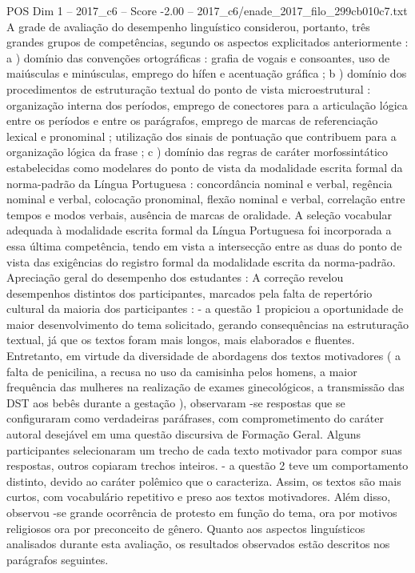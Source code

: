 \begin{textsample}{POS Dim 1 – 2017\_c6 – Score -2.00 – 2017\_c6/enade\_2017\_filo\_299cb010c7.txt}
A grade de avaliação do desempenho linguístico considerou, portanto, três grandes grupos de competências, segundo os aspectos explicitados anteriormente : a ) domínio das convenções ortográficas : grafia de vogais e consoantes, uso de maiúsculas e minúsculas, emprego do hífen e acentuação gráfica ; b ) domínio dos procedimentos de estruturação textual do ponto de vista microestrutural : organização interna dos períodos, emprego de conectores para a articulação lógica entre os períodos e entre os parágrafos, emprego de marcas de referenciação lexical e pronominal ; utilização dos sinais de pontuação que contribuem para a organização lógica da frase ; c ) domínio das regras de caráter morfossintático estabelecidas como modelares do ponto de vista da modalidade escrita formal da norma-padrão da Língua Portuguesa : concordância nominal e verbal, regência nominal e verbal, colocação pronominal, flexão nominal e verbal, correlação entre tempos e modos verbais, ausência de marcas de oralidade.
A seleção vocabular adequada à modalidade escrita formal da Língua Portuguesa foi incorporada a essa última competência, tendo em vista a intersecção entre as duas do ponto de vista das exigências do registro formal da modalidade escrita da norma-padrão.
Apreciação geral do desempenho dos estudantes : A correção revelou desempenhos distintos dos participantes, marcados pela falta de repertório cultural da maioria dos participantes : - a questão 1 propiciou a oportunidade de maior desenvolvimento do tema solicitado, gerando consequências na estruturação textual, já que os textos foram mais longos, mais elaborados e fluentes.
Entretanto, em virtude da diversidade de abordagens dos textos motivadores ( a falta de penicilina, a recusa no uso da camisinha pelos homens, a maior frequência das mulheres na realização de exames ginecológicos, a transmissão das DST aos bebês durante a gestação ), observaram -se respostas que se configuraram como verdadeiras paráfrases, com comprometimento do caráter autoral desejável em uma questão discursiva de Formação Geral.
Alguns participantes selecionaram um trecho de cada texto motivador para compor suas respostas, outros copiaram trechos inteiros. - a questão 2 teve um comportamento distinto, devido ao caráter polêmico que o caracteriza.
Assim, os textos são mais curtos, com vocabulário repetitivo e preso aos textos motivadores.
Além disso, observou -se grande ocorrência de protesto em função do tema, ora por motivos religiosos ora por preconceito de gênero.
Quanto aos aspectos linguísticos analisados durante esta avaliação, os resultados observados estão descritos nos parágrafos seguintes.

\end{textsample}
